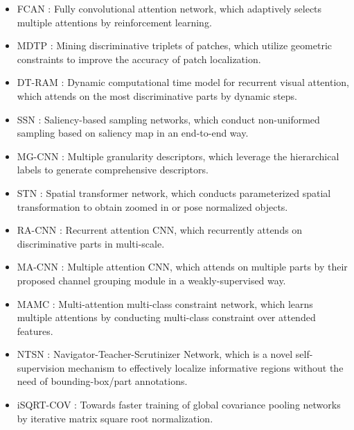 \documentclass[10pt,twocolumn,letterpaper]{article}
\begin{document}
\begin{itemize}
\item FCAN \cite{liu2016fully}: Fully convolutional attention network, which adaptively selects multiple attentions by reinforcement learning.
\item MDTP \cite{wang2016mining}: Mining discriminative triplets of patches, which utilize geometric constraints to improve the accuracy of patch localization.
\item DT-RAM \cite{li2017dynamic}: Dynamic computational time model for recurrent visual attention, which attends on the most discriminative parts by dynamic steps.
\item SSN \cite{recasens2018learning}: Saliency-based sampling networks, which conduct non-uniformed sampling based on saliency map in an end-to-end way.
\item MG-CNN \cite{multi-grained}: Multiple granularity descriptors, which leverage the hierarchical labels to generate comprehensive descriptors.
\item STN \cite{SpatialTrans}: Spatial transformer network, which conducts parameterized spatial transformation to obtain zoomed in or pose normalized objects.
\item RA-CNN \cite{Fu_2017_CVPR}: Recurrent attention CNN, which recurrently attends on discriminative parts in multi-scale.
\item MA-CNN \cite{Zheng_2017_ICCV}: Multiple attention CNN, which attends on multiple parts by their proposed channel grouping module in a weakly-supervised way.
\item MAMC \cite{sun2018multi}: Multi-attention multi-class constraint network, which learns multiple attentions by conducting multi-class constraint over attended features.
\item NTSN \cite{yang2018learning}: Navigator-Teacher-Scrutinizer Network, which is a novel self-supervision mechanism to effectively localize informative regions without the need of bounding-box/part annotations.
\item iSQRT-COV \cite{Li_2018_CVPR}: Towards faster training of global covariance pooling networks by iterative matrix square root normalization.


\end{itemize}
\end{document}
